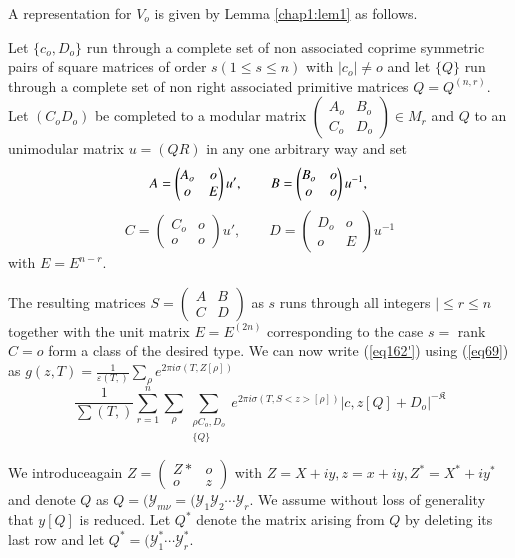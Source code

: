 A representation for $V_o$ is given by Lemma \ref{chap1:lem1} as follows.

Let $\{c_o, D_o\}$ run through a complete set of non associated
coprime symmetric pairs of square matrices of order $s(1 \le s \le n
)$ with $| c_o | \neq o$ and let $\{Q\}$ run through a complete set of
non right associated primitive matrices $Q  = Q^{(n, r)}$. Let $(C_o
D_o)$ be completed to a modular matrix $\begin{pmatrix} A_o & B_o
  \\ C_o & D_o \end{pmatrix} \in M_r$ and $Q$ to an unimodular matrix
$u = (Q R)$ in any one arbitrary way and set 
$$
A = 
\begin{pmatrix}
A_o & o \\ 
 o & E
\end{pmatrix}
u',\qquad B =
\begin{pmatrix}
B_o & o \\
o & o
\end{pmatrix}
u^{-1},\\
$$
$$
C = 
\begin{pmatrix}
C_o & o \\
o & o
\end{pmatrix}
u' ,  \qquad D =
\begin{pmatrix}
D_o & o\\
o & E
\end{pmatrix}
u^{-1}
$$
with $E = E^{n - r}$.

The resulting matrices $S = \begin{pmatrix} A & B \\ C &
  D \end{pmatrix}$ as $s$ runs through all integers $| \le r \le n$
together with the unit matrix $E = E^{(2 n)}$  corresponding to the
case $s = $ rank $C = o$ form a class of the desired type. We can now
write (\ref{eq162'}) using (\ref{eq69}) as $g (z, T) =
\frac{1}{\varepsilon (T,)} \sum_\rho e^{2 \pi i \sigma (T, Z [\rho])}$  
\begin{equation*}
\frac{1}{\sum (T,)} \sum_{r  = 1}^{n} \sum_\rho \sum_{\substack{\rho
    C_o, D_o \\ \{ Q \} }} e^{2 \pi  i \sigma(T, S <z> [\rho])} |c, z
     [Q] + D_o |^{-\mathfrak{K}} \tag{188}\label{eq188}  
\end{equation*}

We introduce\pageoriginale  again $Z = \begin{pmatrix} Z*  & o \\ o &
  z \end{pmatrix}$ with $Z = X + i y, z = x + i y, Z^* = X^* + i y^*$
and denote $Q$ as $Q = (\mathscr{Y}_{m \nu} = (\mathscr{Y}_1
\mathscr{Y}_2 \cdots \mathscr{Y}_r$. We assume without loss of
generality that $y [Q]$ is reduced. Let $Q^*$ denote the matrix
arising from $Q$ by deleting its last row and let $Q^* =
(\mathscr{Y}^*_1 \cdots \mathscr{Y}^*_r$. 


